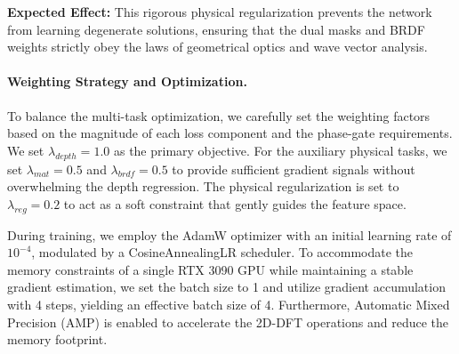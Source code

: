 \textbf{Expected Effect:} This rigorous physical regularization prevents the network from learning degenerate solutions, ensuring that the dual masks and BRDF weights strictly obey the laws of geometrical optics and wave vector analysis.

\paragraph{Weighting Strategy and Optimization.}
To balance the multi-task optimization, we carefully set the weighting factors based on the magnitude of each loss component and the phase-gate requirements. We set $\lambda_{depth} = 1.0$ as the primary objective. For the auxiliary physical tasks, we set $\lambda_{mat} = 0.5$ and $\lambda_{brdf} = 0.5$ to provide sufficient gradient signals without overwhelming the depth regression. The physical regularization is set to $\lambda_{reg} = 0.2$ to act as a soft constraint that gently guides the feature space.

During training, we employ the AdamW optimizer with an initial learning rate of $10^{-4}$, modulated by a CosineAnnealingLR scheduler. To accommodate the memory constraints of a single RTX 3090 GPU while maintaining a stable gradient estimation, we set the batch size to 1 and utilize gradient accumulation with 4 steps, yielding an effective batch size of 4. Furthermore, Automatic Mixed Precision (AMP) is enabled to accelerate the 2D-DFT operations and reduce the memory footprint.
